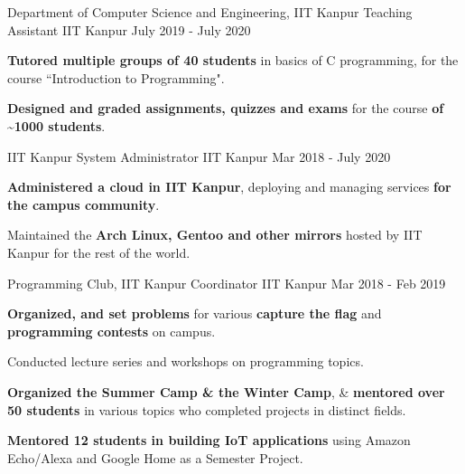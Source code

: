 

\begin{cventries}

  \extraentry
  {Department of Computer Science and Engineering, IIT Kanpur}
  {Teaching Assistant}
  {IIT Kanpur}
  {July 2019 - July 2020}
  {
    \begin{cvitems}
    \item \textbf{Tutored multiple groups of 40 students} in basics of C programming, for the course ``Introduction to Programming".
    \item \textbf{Designed and graded assignments, quizzes and exams} for the course \textbf{of \textasciitilde 1000 students}.
    \end{cvitems}
  }

  \extraentry
  {IIT Kanpur}
  {System Administrator}
  {IIT Kanpur}
  {Mar 2018 - July 2020}
  {
    \begin{cvitems}
    \item \textbf{Administered a cloud in IIT Kanpur}, deploying and managing services \textbf{for the campus community}.
    \item Maintained the \textbf{Arch Linux, Gentoo and other mirrors} hosted by IIT Kanpur for the rest of the world.
    \end{cvitems}
  }

  \extraentry
  {Programming Club, IIT Kanpur}
  {Coordinator}
  {IIT Kanpur}
  {Mar 2018 - Feb 2019}
  {
    \begin{cvitems}
      \item \textbf{Organized, and set problems} for various \textbf{capture the flag} and \textbf{programming contests} on campus.
      \item Conducted lecture series and workshops on programming topics.
      \item \textbf{Organized the Summer Camp \& the Winter Camp}, \& \textbf{mentored over 50 students} in various topics who completed projects in distinct fields.
      \item \textbf{Mentored 12 students in building IoT applications} using Amazon Echo/Alexa and Google Home as a Semester Project.
    \end{cvitems}
  }


\end{cventries}
